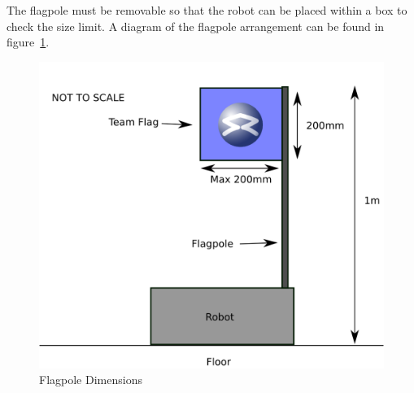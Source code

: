The flagpole must be removable so that the robot can be placed within a box to check the size limit.
A diagram of the flagpole arrangement can be found in figure~\ref{fig:flag}.

\begin{figure}
\begin{center}
\includegraphics[keepaspectratio, scale =1]{./images/flag.png}
\caption{\label{fig:flag}Flagpole Dimensions}
\end{center}
\end{figure}
\clearpage
